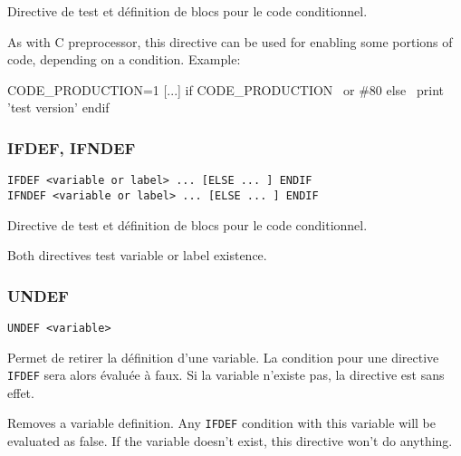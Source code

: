 \begin{xfr}
Directive de test et définition de blocs pour le code conditionnel.
\end{xfr}

\begin{xen}
As with C preprocessor, this directive can be used for enabling some portions of code, depending on a condition.
Example:
\end{xen}

\begin{code}
CODE\_PRODUCTION=1
[...]
if CODE\_PRODUCTION
\  or \#80
else
\  print 'test version'
endif
\end{code}

\subsubsection{IFDEF, IFNDEF}
\begin{verbatim}
IFDEF <variable or label> ... [ELSE ... ] ENDIF
IFNDEF <variable or label> ... [ELSE ... ] ENDIF
\end{verbatim}

\begin{xfr}
Directive de test et définition de blocs pour le code conditionnel.
\end{xfr}

\begin{xen}
Both directives test variable or label existence.
\end{xen}

\subsubsection{UNDEF}
\begin{verbatim}
UNDEF <variable>
\end{verbatim}

\begin{xfr}
Permet de retirer la définition d'une variable.
La condition pour une directive \texttt{IFDEF} sera alors évaluée à faux.
Si la variable n'existe pas, la directive est sans effet.
\end{xfr}

\begin{xen}
Removes a variable definition. Any \texttt{IFDEF} condition with this variable will be evaluated as false.
If the variable doesn't exist, this directive won't do anything.
\end{xen}

